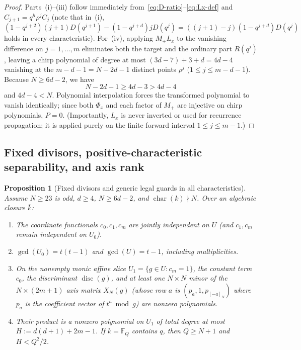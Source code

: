 \documentclass[11pt,reqno]{amsart}
\numberwithin{equation}{section}
\newtheorem{proposition}[theorem]{Proposition}
\theoremstyle{definition}
\theoremstyle{remark}
\newcommand{\F}{\mathbb{F}}
\newcommand{\disc}{\operatorname{disc}}
\begin{document}
\begin{proof}
Parts~(i)--(iii) follow immediately from~\eqref{eq:D-ratio}--\eqref{eq:Lx-def} and $C_{j+1}=q^h\rho^j C_j$ (note that in~(i), $(1-q^{j+2})(j+1)D(q^{j+1}) - (1-q^{j+d})jD(q^j) = ((j+1)-j)(1-q^{j+d})D(q^j)$ holds in every characteristic). For~(iv), applying $M_+ L_x$ to the vanishing difference on $j=1,\ldots,m$ eliminates both the target and the ordinary part $R(q^j)$, leaving a chirp polynomial of degree at most $(3d-7)+3+d = 4d-4$ vanishing at the $m-d-1 = N-2d-1$ distinct points $\rho^j$ ($1\le j\le m-d-1$). Because $N\ge 6d-2$, we have
\[
N - 2d - 1 \ge 4d - 3 > 4d - 4
\]
and $4d-4 < N$. Polynomial interpolation forces the transformed polynomial to vanish identically; since both $\Phi_x$ and each factor of $M_+$ are injective on chirp polynomials, $P=0$. (Importantly, $L_x$ is never inverted or used for recurrence propagation; it is applied purely on the finite forward interval $1\le j\le m-1$.)
\end{proof}

\subsection{Fixed divisors, positive-characteristic separability, and axis rank}

\begin{proposition}[Fixed divisors and generic legal guards in all characteristics]
\label{prop:guards}
Assume $N\ge 23$ is odd, $d\ge 4$, $N\ge 6d-2$, and $\operatorname{char}(k)\nmid N$. Over an algebraic closure $\overline{k}$:
\begin{enumerate}[label=(\alph*),leftmargin=2em]
\item The coordinate functionals $c_0,c_1,c_m$ are jointly independent on $U$ (and $c_1,c_m$ remain independent on $U_0$).
\item $\gcd(U_0) = t(t-1)$ and $\gcd(U) = t-1$, including multiplicities.
\item On the nonempty monic affine slice $U_1=\{g\in U : c_m=1\}$, the constant term $c_0$, the discriminant $\disc(g)$, and at least one $N\times N$ minor of the $N\times(2m+1)$ axis matrix $X_N(g)$ (whose row $a$ is $(p_a, 1, p_{[-a]_N})$ where $p_a$ is the coefficient vector of $t^a\bmod g$) are nonzero polynomials.
\item Their product is a nonzero polynomial on $U_1$ of total degree at most $H := d(d+1) + 2m - 1$. If $k=\F_Q$ contains $q$, then $Q\ge N+1$ and $H < Q^2/2$.
\end{enumerate}
\end{proposition}
\end{document}
